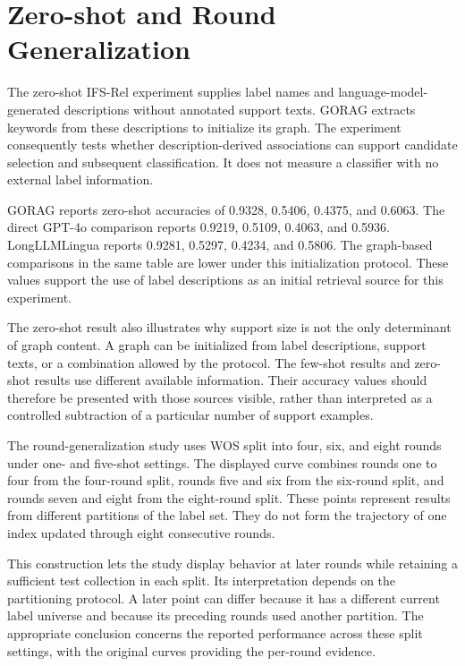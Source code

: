 \section{Zero-shot and Round Generalization}
\label{sec:gorag:generalization}

The zero-shot IFS-Rel experiment supplies label names and language-model-generated descriptions without annotated support texts. GORAG extracts keywords from these descriptions to initialize its graph. The experiment consequently tests whether description-derived associations can support candidate selection and subsequent classification. It does not measure a classifier with no external label information.



GORAG reports zero-shot accuracies of 0.9328, 0.5406, 0.4375, and 0.6063. The direct GPT-4o comparison reports 0.9219, 0.5109, 0.4063, and 0.5936. LongLLMLingua reports 0.9281, 0.5297, 0.4234, and 0.5806. The graph-based comparisons in the same table are lower under this initialization protocol. These values support the use of label descriptions as an initial retrieval source for this experiment.

The zero-shot result also illustrates why support size is not the only determinant of graph content. A graph can be initialized from label descriptions, support texts, or a combination allowed by the protocol. The few-shot results and zero-shot results use different available information. Their accuracy values should therefore be presented with those sources visible, rather than interpreted as a controlled subtraction of a particular number of support examples.

The round-generalization study uses WOS split into four, six, and eight rounds under one- and five-shot settings. The displayed curve combines rounds one to four from the four-round split, rounds five and six from the six-round split, and rounds seven and eight from the eight-round split. These points represent results from different partitions of the label set. They do not form the trajectory of one index updated through eight consecutive rounds.

This construction lets the study display behavior at later rounds while retaining a sufficient test collection in each split. Its interpretation depends on the partitioning protocol. A later point can differ because it has a different current label universe and because its preceding rounds used another partition. The appropriate conclusion concerns the reported performance across these split settings, with the original curves providing the per-round evidence.



